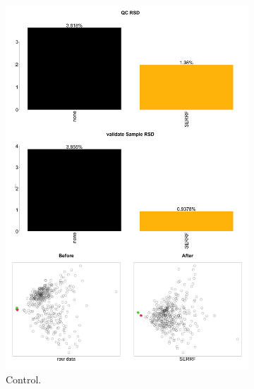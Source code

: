\documentclass[10pt,letterpaper]{article}
\begin{document}
\begin{figure}[htp]
  \centering

  \begin{subfigure}[t]{0.48\textwidth}
    \includegraphics[width=\linewidth]{fig/supp/SuppFig_2A_RSD_PCA_Control.png}
    \caption{Control.}
    \label{fig:S2A}
  \end{subfigure}\hfill
  \begin{subfigure}[t]{0.48\textwidth}

\end{subfigure}
\end{figure}
\end{document}
